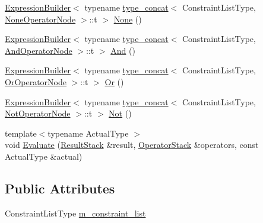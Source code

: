 \begin{DoxyCompactItemize}
\item 
\mbox{\hyperlink{structsnowhouse_1_1ExpressionBuilder}{Expression\+Builder}}$<$ typename \mbox{\hyperlink{structsnowhouse_1_1type__concat}{type\+\_\+concat}}$<$ Constraint\+List\+Type, \mbox{\hyperlink{structsnowhouse_1_1ExpressionBuilder_aaf5a1da1881c71098209387a4cf2821a}{None\+Operator\+Node}} $>$\+::t $>$ \mbox{\hyperlink{structsnowhouse_1_1ExpressionBuilder_a867aad9a4a72ee990eb9c4e0342ea7d8}{None}} ()
\item 
\mbox{\hyperlink{structsnowhouse_1_1ExpressionBuilder}{Expression\+Builder}}$<$ typename \mbox{\hyperlink{structsnowhouse_1_1type__concat}{type\+\_\+concat}}$<$ Constraint\+List\+Type, \mbox{\hyperlink{structsnowhouse_1_1ExpressionBuilder_acfa4ad415e3fac4f1a161d56268a99fc}{And\+Operator\+Node}} $>$\+::t $>$ \mbox{\hyperlink{structsnowhouse_1_1ExpressionBuilder_a0f0a34d1d1836d2352a72e8aa7cb7cc2}{And}} ()
\item 
\mbox{\hyperlink{structsnowhouse_1_1ExpressionBuilder}{Expression\+Builder}}$<$ typename \mbox{\hyperlink{structsnowhouse_1_1type__concat}{type\+\_\+concat}}$<$ Constraint\+List\+Type, \mbox{\hyperlink{structsnowhouse_1_1ExpressionBuilder_a57a8b9f5c8cdc9cc9b8ae5165a515e61}{Or\+Operator\+Node}} $>$\+::t $>$ \mbox{\hyperlink{structsnowhouse_1_1ExpressionBuilder_aac1267b9a7d94e22e69d98135edc6896}{Or}} ()
\item 
\mbox{\hyperlink{structsnowhouse_1_1ExpressionBuilder}{Expression\+Builder}}$<$ typename \mbox{\hyperlink{structsnowhouse_1_1type__concat}{type\+\_\+concat}}$<$ Constraint\+List\+Type, \mbox{\hyperlink{structsnowhouse_1_1ExpressionBuilder_a5de76f3efcd7456a66de89edc66b21a4}{Not\+Operator\+Node}} $>$\+::t $>$ \mbox{\hyperlink{structsnowhouse_1_1ExpressionBuilder_ab73bbbbbe02a9ddbb28e2790a636bc0e}{Not}} ()
\item 
{\footnotesize template$<$typename Actual\+Type $>$ }\\void \mbox{\hyperlink{structsnowhouse_1_1ExpressionBuilder_a9485df17c1551ede162d861629429eb4}{Evaluate}} (\mbox{\hyperlink{namespacesnowhouse_a719169b1315a13161c15f25e600a8f51}{Result\+Stack}} \&result, \mbox{\hyperlink{namespacesnowhouse_adcb10e215e6a4bbcb35722a9c7270fc6}{Operator\+Stack}} \&operators, const Actual\+Type \&actual)
\end{DoxyCompactItemize}
\subsection*{Public Attributes}
\begin{DoxyCompactItemize}
\item 
Constraint\+List\+Type \mbox{\hyperlink{structsnowhouse_1_1ExpressionBuilder_a1c72c0f5c07834ddd2ce3291a4b03fcc}{m\+\_\+constraint\+\_\+list}}
\end{DoxyCompactItemize}


